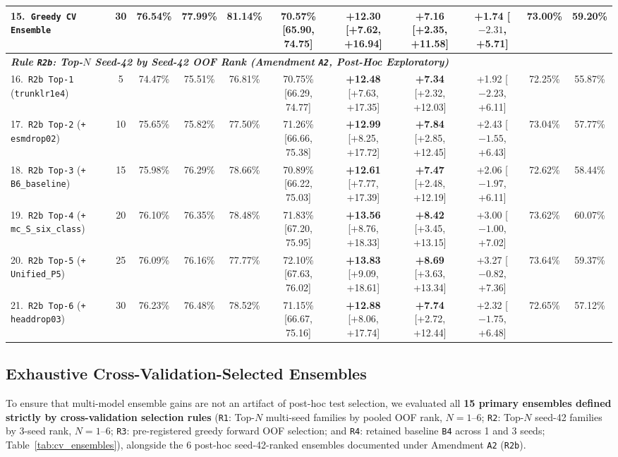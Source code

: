 \documentclass[10pt,a4paper,twocolumn]{article}
\begin{document}
\begin{table}[t!]
\begin{tabular}{lcccccccccc}
    15.\ \texttt{Greedy CV Ensemble} & 30 & 76.54\% & \textbf{77.99\%} & \textbf{81.14\%} & 70.57\% [65.90, 74.75] & \textbf{+12.30} [+7.62, +16.94] & \textbf{+7.16} [+2.35, +11.58] & +1.74 [$-2.31$, +5.71] & 73.00\% & 59.20\% \\
    \midrule
    \multicolumn{11}{l}{\textit{\textbf{Rule \texttt{R2b}: Top-$N$ Seed-42 by Seed-42 OOF Rank (Amendment \texttt{A2}, Post-Hoc Exploratory)}}} \\
    16.\ \texttt{R2b Top-1} (\texttt{trunklr1e4}) & 5 & 74.47\% & 75.51\% & 76.81\% & 70.75\% [66.29, 74.77] & \textbf{+12.48} [+7.63, +17.35] & \textbf{+7.34} [+2.32, +12.03] & +1.92 [$-2.23$, +6.11] & 72.25\% & 55.87\% \\
    17.\ \texttt{R2b Top-2} (\texttt{+ esmdrop02}) & 10 & 75.65\% & 75.82\% & 77.50\% & 71.26\% [66.66, 75.38] & \textbf{+12.99} [+8.25, +17.72] & \textbf{+7.84} [+2.85, +12.45] & +2.43 [$-1.55$, +6.43] & 73.04\% & 57.77\% \\
    18.\ \texttt{R2b Top-3} (\texttt{+ B6\_baseline}) & 15 & 75.98\% & 76.29\% & 78.66\% & 70.89\% [66.22, 75.03] & \textbf{+12.61} [+7.77, +17.39] & \textbf{+7.47} [+2.48, +12.19] & +2.06 [$-1.97$, +6.11] & 72.62\% & 58.44\% \\
    19.\ \texttt{R2b Top-4} (\texttt{+ mc\_S\_six\_class}) & 20 & 76.10\% & 76.35\% & 78.48\% & 71.83\% [67.20, 75.95] & \textbf{+13.56} [+8.76, +18.33] & \textbf{+8.42} [+3.45, +13.15] & +3.00 [$-1.00$, +7.02] & 73.62\% & 60.07\% \\
    20.\ \texttt{R2b Top-5} (\texttt{+ Unified\_P5}) & 25 & 76.09\% & 76.16\% & 77.77\% & 72.10\% [67.63, 76.02] & \textbf{+13.83} [+9.09, +18.61] & \textbf{+8.69} [+3.63, +13.34] & +3.27 [$-0.82$, +7.36] & 73.64\% & 59.37\% \\
    21.\ \texttt{R2b Top-6} (\texttt{+ headdrop03}) & 30 & 76.23\% & 76.48\% & 78.52\% & 71.15\% [66.67, 75.16] & \textbf{+12.88} [+8.06, +17.74] & \textbf{+7.74} [+2.72, +12.44] & +2.32 [$-1.75$, +6.48] & 72.65\% & 57.12\% \\
    \bottomrule
  \end{tabular}
\end{table}

\subsection{Exhaustive Cross-Validation-Selected Ensembles}

To ensure that multi-model ensemble gains are not an artifact of post-hoc test selection, we evaluated all \textbf{15 primary ensembles defined strictly by cross-validation selection rules} (\texttt{R1}: Top-$N$ multi-seed families by pooled OOF rank, $N=1\text{--}6$; \texttt{R2}: Top-$N$ seed-42 families by 3-seed rank, $N=1\text{--}6$; \texttt{R3}: pre-registered greedy forward OOF selection; and \texttt{R4}: retained baseline \texttt{B4} across 1 and 3 seeds; Table~\ref{tab:cv_ensembles}), alongside the 6 post-hoc seed-42-ranked ensembles documented under Amendment \texttt{A2} (\texttt{R2b}).
\end{document}
